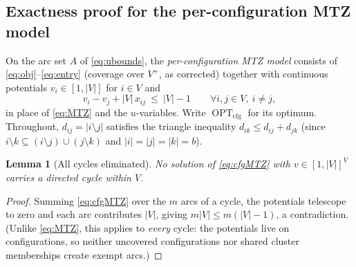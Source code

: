 \documentclass[11pt,a4paper]{article}
\theoremstyle{plain}
\newtheorem{lemma}[theorem]{Lemma}
\theoremstyle{definition}
\DeclareMathOperator{\OPT}{OPT}
\begin{document}
\subsection{Exactness proof for the per-configuration MTZ model}
\label{sec:perconfigproof}


On the arc set $A$ of \eqref{eq:ubounds}, the \emph{per-configuration MTZ model} consists of
\eqref{eq:obj}--\eqref{eq:entry} (coverage over $V^{+}$, as corrected) together with
continuous potentials $v_i\in[1,|V|]$ for $i\in V$ and
\begin{equation}\label{eq:cfgMTZ}
	v_i-v_j+|V|\,x_{ij}\ \le\ |V|-1\qquad\forall i,j\in V,\ i\ne j,
\end{equation}
in place of \eqref{eq:MTZ} and the $u$-variables. Write $\OPT_{\mathrm{cfg}}$ for its
optimum. Throughout, $d_{ij}=|i\setminus j|$ satisfies the triangle inequality
$d_{ik}\le d_{ij}+d_{jk}$ (since $i\setminus k\subseteq(i\setminus j)\cup(j\setminus k)$
and $|i|=|j|=|k|=b$).

\begin{thmbox}
	\begin{lemma}[All cycles eliminated]
		\label{lem:cyclefree}
		No solution of \eqref{eq:cfgMTZ} with $v\in[1,|V|]^{V}$ carries a directed cycle
		within $V$.
	\end{lemma}
\end{thmbox}
\begin{proofbox}
	\begin{proof}
		Summing \eqref{eq:cfgMTZ} over the $m$ arcs of a cycle, the potentials telescope to
		zero and each arc contributes $|V|$, giving $m|V|\le m(|V|-1)$, a contradiction.
		(Unlike \eqref{eq:MTZ}, this applies to \emph{every} cycle: the potentials live on
		configurations, so neither uncovered configurations nor shared cluster memberships
		create exempt arcs.)
	\end{proof}
\end{proofbox}
\end{document}
